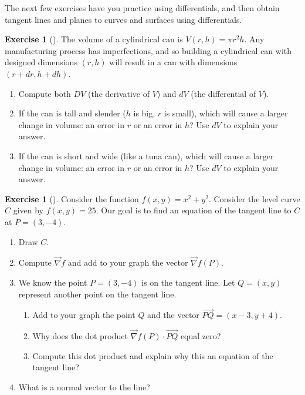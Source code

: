 \documentclass[10pt,]{book}
\theoremstyle{plain}
\theoremstyle{definition}
\theoremstyle{definition}
\theoremstyle{definition}
\theoremstyle{definition}
\newtheorem{exploration}[project]{Exercise}
\theoremstyle{definition}
\numberwithin{equation}{section}
\begin{document}
The next few exercises have you practice using differentials, and then obtain tangent lines and planes to curves and surfaces using differentials.%
\begin{exploration}[]\label{exploration-229}
The volume of a cylindrical can is \(V(r,h)=\pi r^2 h\). Any manufacturing process has imperfections, and so building a cylindrical can with designed dimensions \((r,h)\) will result in a can with dimensions \((r+dr,h+dh)\).%
\begin{enumerate}[font=\bfseries,label=(\alph*),ref=\alph*]
\item\label{task-623} Compute both \(DV\) (the derivative of \(V\)) and \(dV\) (the differential of \(V\)).%
\item\label{task-624} If the can is tall and slender (\(h\) is big, \(r\) is small), which will cause a larger change in volume: an error in \(r\) or an error in \(h\)? Use \(dV\) to explain your answer.%
\item\label{task-625} If the can is short and wide (like a tuna can), which will cause a larger change in volume: an error in \(r\) or an error in \(h\)? Use \(dV\) to explain your answer.%
\end{enumerate}
\end{exploration}
\begin{exploration}[]\label{exploration-230}
Consider the function \(f(x,y)=x^2+y^2\). Consider the level curve \(C\) given by \(f(x,y)=25\). Our goal is to find an equation of the tangent line to \(C\) at \(P=(3,-4)\).%
\begin{enumerate}[font=\bfseries,label=(\alph*),ref=\alph*]
\item\label{task-626} Draw \(C\).%
\item\label{task-627} Compute \(\vec \nabla f\) and add to your graph the vector \(\vec \nabla f(P)\).%
\item\label{task-628} We know the point \(P=(3,-4)\) is on the tangent line. Let \(Q=(x,y)\) represent another point on the tangent line.%
\begin{enumerate}[font=\bfseries,label=(\roman*),ref=\theenumi.\roman*]
\item\label{task-629} Add to your graph the point \(Q\) and the vector \(\vec {PQ} = (x-3,y+4)\).%
\item\label{task-630} Why does the dot product \(\vec \nabla f(P)\cdot\vec{PQ}\) equal zero?%
\item\label{task-631} Compute this dot product and explain why this an equation of the tangent line?%
\end{enumerate}
\item\label{task-632} What is a normal vector to the line?%
\end{enumerate}
\end{exploration}
\end{document}
